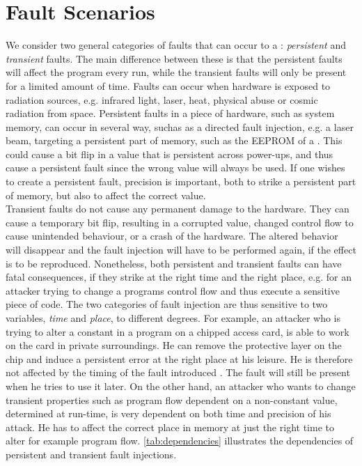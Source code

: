 \section{Fault Scenarios}
We consider two general categories of faults that can occur to a \jc: \textit{persistent} and \textit{transient} faults. The main difference between these is that the persistent faults will affect the program every run, while the transient faults will only be present for a limited amount of time. Faults can occur when hardware is exposed to radiation sources, e.g. infrared light, laser, heat, physical abuse or cosmic radiation from space. 
Persistent faults in a piece of hardware, such as system memory, can occur in several way, suchas as a directed fault injection, e.g. a laser beam, targeting a persistent part of memory, such as the EEPROM of a \jc. This could cause a bit flip in a value that is persistent across power-ups, and thus cause a persistent fault since the wrong value will always be used. If one wishes to create a persistent fault, precision is important, both to strike a persistent part of memory, but also to affect the correct value.\\


Transient faults do not cause any permanent damage to the hardware. They can cause a temporary bit flip, resulting in a corrupted value, changed control flow to cause unintended behaviour, or a crash of the hardware. The altered behavior will disappear and the fault injection will have to be performed again, if the effect is to be reproduced.
Nonetheless, both persistent and transient faults can have fatal consequences, if they strike at the right time and the right place, e.g. for an attacker trying to change a programs control flow and thus execute a sensitive piece of code. The two categories of fault injection are thus sensitive to two variables, \textit{time} and \textit{place}, to different degrees. For example, an attacker who is trying to alter a constant in a program on a chipped access card, is able to work on the card in private surroundings. He can remove the protective layer on the chip and induce a persistent error at the right place at his leisure. He is therefore not affected by the timing of the fault introduced . The fault will still be present when he tries to use it later. On the other hand, an attacker who wants to change transient properties such as program flow dependent on a non-constant value, determined at run-time, is very dependent on both time and precision of his attack. He has to affect the correct place in memory at just the right time to alter for example program flow. \cref{tab:dependencies} illustrates the dependencies of persistent and transient fault injections.

